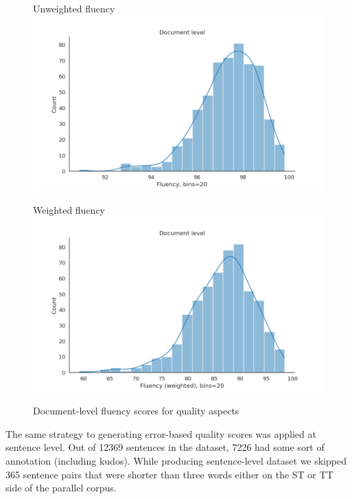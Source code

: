 \begin{figure}[H]
	\begin{minipage}[c]{0.45\linewidth}
		\centering
		Unweighted fluency
		\includegraphics[width=\textwidth]{figures/err/doc-fluency-noweights}
	\end{minipage}
	\begin{minipage}[c]{0.45\linewidth}
		\centering
		Weighted fluency
		\includegraphics[width=\textwidth]{figures/err/doc-fluency-major2critical5weighted}
	\end{minipage}
	\caption{Document-level fluency scores for quality aspects}
	\label{fig:docs_fluency}
\end{figure}

The same strategy to generating error-based quality scores was applied at sentence level. Out of 12369 sentences in the dataset, 7226 had some sort of annotation (including kudos). While producing sentence-level dataset we skipped 365 sentence pairs that were shorter than three words either on the ST or TT side of the parallel corpus. 

